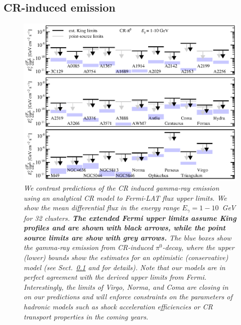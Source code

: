 \documentclass[10pt,aps,pra,reprint,amsmath,amsfonts,amssymb,showpacs,nofootinbib,floatfix]{revtex4-1}
\def\C#1{{\bf #1}}
\newcommand{\Fermi}{{\em Fermi}\xspace}
\begin{document}
\subsection{CR-induced emission}
\label{sec:CRemission} 
\begin{figure}
\begin{minipage}{2.0\columnwidth}
  \includegraphics[width=0.99\columnwidth]{figures/Fermi.comp.CR.diff.eps}
  \caption{\it We contrast predictions of the CR induced gamma-ray
    emission using an analytical CR model \protect
    \cite{2010MNRAS.409..449P} to \Fermi-LAT flux upper limits. We show
    the mean differential flux in the energy range $E_\gamma=1-10$~GeV
    for 32 clusters. \C{The extended \Fermi upper limits assume King
      profiles and are shown with black arrows, while the point source
      limits are show with grey arrows.} The blue boxes show the
    gamma-ray emission from CR-induced $\pi^0$-decay, where the upper
    (lower) bounds show the estimates for an optimistic (conservative)
    model (see Sect.~\ref{sec:CRemission} and
    \cite{2010MNRAS.409..449P} for details). Note that our models are
    in perfect agreement with the derived upper limits from
    \Fermi. Interestingly, the limits of Virgo, Norma, and Coma are
    closing in on our predictions and will enforce constraints on the
    parameters of hadronic models such as shock acceleration
    efficiencies or CR transport properties in the coming years.}
 \label{fig15}
\end{minipage}
\end{figure}
\end{document}

